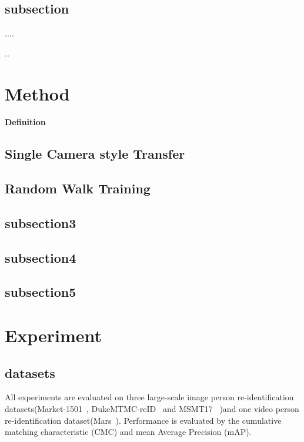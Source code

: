 \documentclass{article}
\begin{document}
\subsection{subsection}
....

..

\section{Method}
\paragraph{Definition} 

\subsection{Single Camera style Transfer}

\subsection{Random Walk Training}

\subsection{subsection3}
\subsection{subsection4}
\subsection{subsection5}

\section{Experiment}
\subsection{datasets}

All experiments are evaluated on three large-scale image person re-identification datasets(Market-1501~\cite{zheng2015scalable}, DukeMTMC-reID~\cite{ristani2016performance,zheng2017unlabeled} and MSMT17~\cite{wei2018person} )and one video person re-identification dataset(Mars~\cite{zheng2016mars}). Performance is evaluated by the cumulative matching characteristic (CMC) and mean Average Precision (mAP).
\end{document}
